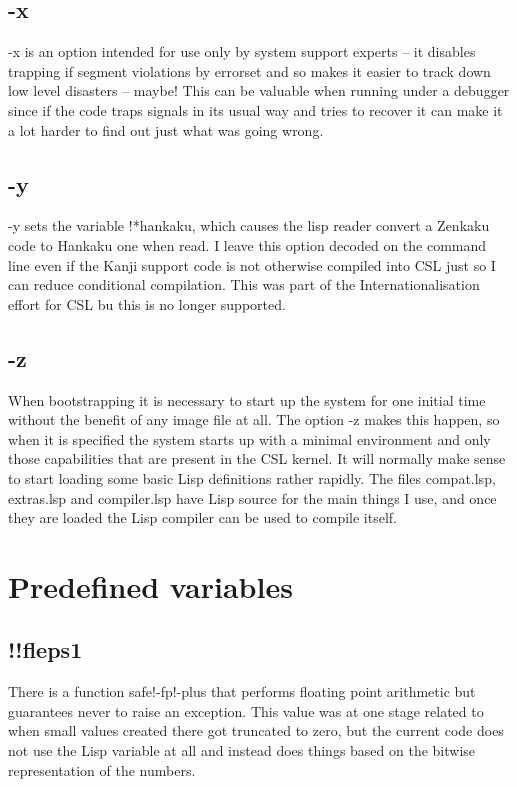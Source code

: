 \documentclass[a4paper,11pt]{article}
\begin{document}
\subsection{\ttfamily -x}
   {\ttfamily -x} is an option intended for use only by system
   support experts -- it disables trapping if segment violations by
   errorset and so makes it easier to track down low level disasters --
   maybe!  This can be valuable when running under a debugger since if the
   code traps signals in its usual way and tries to recover it can make it a lot
   harder to find out just what was going wrong.

\subsection{\ttfamily -y}
   {\ttfamily -y } sets the variable {\ttfamily !*hankaku}, which causes the
   lisp reader convert a Zenkaku code to Hankaku one when read. I leave this
   option decoded on the command line even if the Kanji support code is not
   otherwise compiled into CSL just so I can reduce conditional compilation.
   This was part of the Internationalisation effort for CSL bu this is no longer
   supported.

\subsection{\ttfamily -z}
   When bootstrapping it is necessary to start up the system for one initial time
   without the benefit of any image file at all. The option {\ttfamily -z} makes
   this happen, so when it is specified the system starts up with a minimal
   environment and only those capabilities that are present in the CSL
   kernel. It will normally make sense to start loading some basic Lisp
   definitions rather rapidly. The files {\ttfamily compat.lsp},
   {\ttfamily extras.lsp} and {\ttfamily compiler.lsp} have Lisp source for the
   main things I use, and once they are loaded the Lisp compiler can be used
   to compile itself.

\section{Predefined variables}

\subsection{\ttfamily !!fleps1}
   There is a function safe!-fp!-plus that performs floating point
   arithmetic but guarantees never to raise an exception. This value was
   at one stage related to when small values created there got truncated to zero,
   but the current code does not use the Lisp variable at all and instead does
   things based on the bitwise representation of the numbers.
\end{document}
